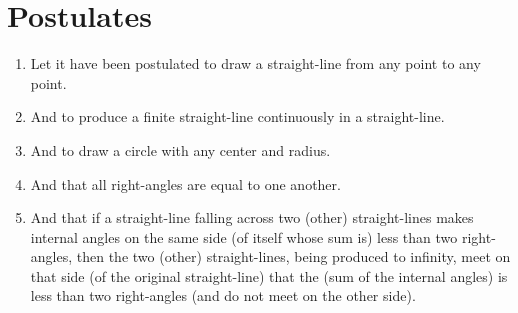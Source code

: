 \chapter{Postulates}

\begin{enumerate}
    \item \label{post:1} Let it have been postulated to draw a straight-line from any point to any point.
    \item \label{post:2} And to produce a finite straight-line continuously in a straight-line.
    \item \label{post:3} And to draw a circle with any center and radius.
    \item \label{post:4} And that all right-angles are equal to one another.
    \item \label{post:5} And that if a straight-line falling across two (other) straight-lines makes internal angles on the same side (of itself whose sum is) less than two right-angles, then the two (other) straight-lines, being produced to infinity, meet on that side (of the original straight-line) that the (sum of the internal angles) is less than two right-angles (and do not meet on the other side).
\end{enumerate}

